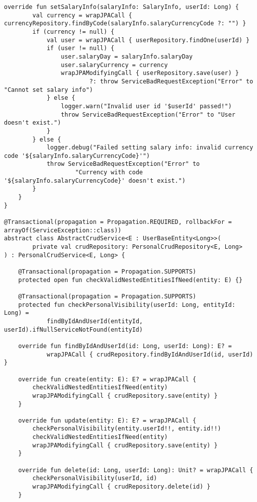 \begin{lstlisting}[style = ktstyle]
    override fun setSalaryInfo(salaryInfo: SalaryInfo, userId: Long) {
        val currency = wrapJPACall { currencyRepository.findByCode(salaryInfo.salaryCurrencyCode ?: "") }
        if (currency != null) {
            val user = wrapJPACall { userRepository.findOne(userId) }
            if (user != null) {
                user.salaryDay = salaryInfo.salaryDay
                user.salaryCurrency = currency
                wrapJPAModifyingCall { userRepository.save(user) }
                        ?: throw ServiceBadRequestException("Error" to "Cannot set salary info")
            } else {
                logger.warn("Invalid user id '$userId' passed!")
                throw ServiceBadRequestException("Error" to "User doesn't exist.")
            }
        } else {
            logger.debug("Failed setting salary info: invalid currency code '${salaryInfo.salaryCurrencyCode}'")
            throw ServiceBadRequestException("Error" to
                    "Currency with code '${salaryInfo.salaryCurrencyCode}' doesn't exist.")
        }
    }
}

@Transactional(propagation = Propagation.REQUIRED, rollbackFor = arrayOf(ServiceException::class))
abstract class AbstractCrudService<E : UserBaseEntity<Long>>(
        private val crudRepository: PersonalCrudRepository<E, Long>
) : PersonalCrudService<E, Long> {

    @Transactional(propagation = Propagation.SUPPORTS)
    protected open fun checkValidNestedEntitiesIfNeed(entity: E) {}

    @Transactional(propagation = Propagation.SUPPORTS)
    protected fun checkPersonalVisibility(userId: Long, entityId: Long) =
            findByIdAndUserId(entityId, userId).ifNullServiceNotFound(entityId)

    override fun findByIdAndUserId(id: Long, userId: Long): E? =
            wrapJPACall { crudRepository.findByIdAndUserId(id, userId) }

    override fun create(entity: E): E? = wrapJPACall {
        checkValidNestedEntitiesIfNeed(entity)
        wrapJPAModifyingCall { crudRepository.save(entity) }
    }

    override fun update(entity: E): E? = wrapJPACall {
        checkPersonalVisibility(entity.userId!!, entity.id!!)
        checkValidNestedEntitiesIfNeed(entity)
        wrapJPAModifyingCall { crudRepository.save(entity) }
    }

    override fun delete(id: Long, userId: Long): Unit? = wrapJPACall {
        checkPersonalVisibility(userId, id)
        wrapJPAModifyingCall { crudRepository.delete(id) }
    }


\end{lstlisting}
